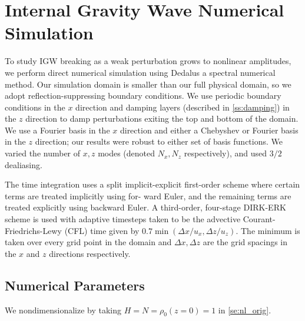 \documentclass[twocolumn,
        nofootinbib, %
        usenames, %
        aps,
        prd,
        dvipsnames %
    ]{revtex4-1}%
\begin{document}
\section{Internal Gravity Wave Numerical Simulation}\label{s:sim}

To study IGW breaking as a weak perturbation grows to nonlinear amplitudes, we
perform direct numerical simulation using Dedalus\cite{dedalus} a spectral
numerical method. Our simulation domain is smaller than our full physical
domain, so we adopt reflection-suppressing boundary conditions. We use periodic
boundary conditions in the $x$ direction and damping layers (described in
\autoref{ss:damping}) in the $z$ direction to damp perturbations exiting the
top and bottom of the domain. We use a Fourier basis in the $x$ direction and
either a Chebyshev or Fourier basis in the $z$ direction; our results were
robust to either set of basis functions. We varied the number of $x, z$ modes
(denoted $N_x, N_z$ respectively), and used $3/2$ dealiasing\cite{boyd}.

The time integration uses a split implicit-explicit first-order scheme where
certain terms are treated implicitly using for- ward Euler, and the remaining
terms are treated explicitly using backward Euler. A third-order, four-stage
DIRK-ERK scheme\cite{ascher} is used with adaptive timesteps taken to be
the advective Courant-Friedrichs-Lewy (CFL) time given by $0.7 \min (\Delta
x / u_x,\Delta z / u_z)$. The minimum is taken over every grid point in
the domain and $\Delta x,\Delta z$ are the grid spacings in the $x$ and $z$
directions respectively.

\subsection{Numerical Parameters}\label{ss:numerics}

We nondimensionalize by taking $H = N = \rho_0(z=0) = 1$ in
\autoref{se:nl_orig}.
\end{document}
